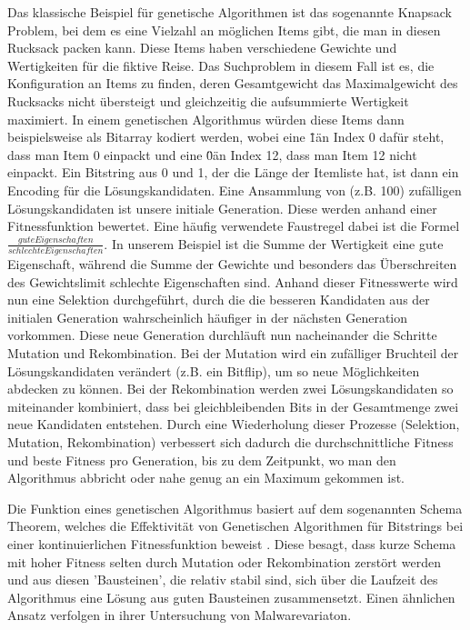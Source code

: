 Das klassische Beispiel für genetische Algorithmen ist das sogenannte Knapsack Problem, bei dem es eine Vielzahl an möglichen Items gibt, die man in diesen Rucksack packen kann. Diese Items haben verschiedene Gewichte und Wertigkeiten für die fiktive Reise. Das Suchproblem in diesem Fall ist es, die Konfiguration an Items zu finden, deren Gesamtgewicht das Maximalgewicht des Rucksacks nicht übersteigt und gleichzeitig die aufsummierte Wertigkeit maximiert.
In einem genetischen Algorithmus würden diese Items dann beispielsweise als Bitarray kodiert werden, wobei eine \"1\" an Index 0 dafür steht, dass man Item 0 einpackt und eine \"0\" an Index 12, dass man Item 12 nicht einpackt. Ein Bitstring aus 0 und 1, der die Länge der Itemliste hat, ist dann ein Encoding für die Lösungskandidaten. Eine Ansammlung von (z.B. 100) zufälligen Lösungskandidaten ist unsere initiale Generation. Diese werden anhand einer Fitnessfunktion bewertet. Eine häufig verwendete Faustregel dabei ist die Formel $ \frac{gute Eigenschaften}{schlechte Eigenschaften}$. In unserem Beispiel ist die Summe der Wertigkeit eine gute Eigenschaft, während die Summe der Gewichte und besonders das Überschreiten des Gewichtslimit schlechte Eigenschaften sind. Anhand dieser Fitnesswerte wird nun eine Selektion durchgeführt, durch die die besseren Kandidaten aus der initialen Generation wahrscheinlich häufiger in der nächsten Generation vorkommen. Diese neue Generation durchläuft nun nacheinander die Schritte Mutation und Rekombination. Bei der Mutation wird ein zufälliger Bruchteil der Lösungskandidaten verändert (z.B. ein Bitflip), um so neue Möglichkeiten abdecken zu können. Bei der Rekombination werden zwei Lösungskandidaten so miteinander kombiniert, dass bei gleichbleibenden Bits in der Gesamtmenge zwei neue Kandidaten entstehen. Durch eine Wiederholung dieser Prozesse (Selektion, Mutation, Rekombination) verbessert sich dadurch die durchschnittliche Fitness und beste Fitness pro Generation, bis zu dem Zeitpunkt, wo man den Algorithmus abbricht oder nahe genug an ein Maximum gekommen ist.

Die Funktion eines genetischen Algorithmus basiert auf dem sogenannten Schema Theorem, welches die Effektivität von Genetischen Algorithmen für Bitstrings bei einer kontinuierlichen Fitnessfunktion beweist \cite{Holland_1992}. Diese besagt, dass kurze Schema mit hoher Fitness selten durch Mutation oder Rekombination zerstört werden und aus diesen 'Bausteinen', die relativ stabil sind, sich über die Laufzeit des Algorithmus eine Lösung aus guten Bausteinen zusammensetzt. Einen ähnlichen Ansatz verfolgen \cite{song_2022_mabmalware} in ihrer Untersuchung von Malwarevariaton.

